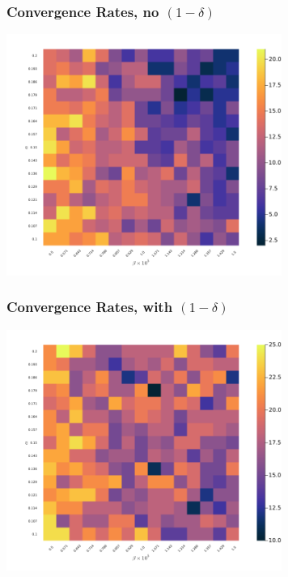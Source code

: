 \documentclass{beamer}
\begin{document}
\begin{frame}\frametitle{Convergence Rates, no $(1-\delta)$}
	\begin{center}
		\includegraphics[width=9cm]{heatmap_convergence_counts_25_nodelta.png}
	\end{center}
\end{frame}
\begin{frame}\frametitle{Convergence Rates, with $(1-\delta)$}
	\begin{center}
		\includegraphics[width=9cm]{heatmap_convergence_counts_25_delta.png}
	\end{center}
\end{frame}



















	
\end{document}
